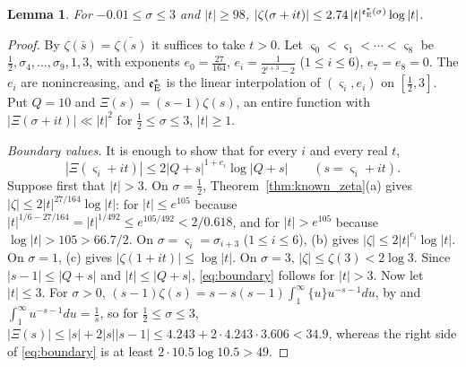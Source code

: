 \documentclass[11pt,a4paper]{article}
\makeatletter
\numberwithin{equation}{section}
\DeclareRobustCommand{\CGref}[1]{\ref{#1}}
\DeclareRobustCommand{\CGeqref}[1]{\eqref{#1}}
\DeclareRobustCommand{\CGcite}[2][]{\if\relax\detokenize{#1}\relax\cite{#2}\else\cite[#1]{#2}\fi}
\let\CG@origref\ref
\let\CG@origeqref\eqref
\newcommand{\CG@gettip}[1]{\@ifundefined{CGTip@#1}{#1}{\csname CGTip@#1\endcsname}}
\newcommand{\CG@getbib}[1]{\@ifundefined{CGBib@#1}{#1}{\csname CGBib@#1\endcsname}}
\DeclareRobustCommand{\CGref}[1]{\pdftooltip{\CG@origref{#1}}{\CG@gettip{#1}}}
\DeclareRobustCommand{\CGeqref}[1]{\pdftooltip{\CG@origeqref{#1}}{\CG@gettip{#1}}}
\DeclareRobustCommand{\CGcite}[2][]{\pdftooltip{\if\relax\detokenize{#1}\relax\cite{#2}\else\cite[#1]{#2}\fi}{\CG@getbib{#2}}}
\newtheorem{lemma}[theorem]{Lemma}
\theoremstyle{definition}
\theoremstyle{remark}
\newcommand{\eE}{\mathfrak e_{\rm E}}
\makeatother
\begin{document}
\begin{lemma}\label{lem:explicit_zeta}
For $-0.01\le\sigma\le3$ and $|t|\ge98$, $|\zeta(\sigma+it)|\le2.74\,|t|^{\eE^*(\sigma)}\log|t|$.
\end{lemma}

\begin{proof}
By $\zeta(\bar s)=\overline{\zeta(s)}$ it suffices to take $t>0$. Let $\varsigma_0<\varsigma_1<\cdots<\varsigma_8$ be $\frac12,\sigma_4,\dots,\sigma_9,1,3$, with exponents $e_0=\frac{27}{164}$, $e_i=\frac1{2^{i+3}-2}$ ($1\le i\le6$), $e_7=e_8=0$. The $e_i$ are nonincreasing, and $\eE^*$ is the linear interpolation of $(\varsigma_i,e_i)$ on $[\frac12,3]$. Put $Q=10$ and $\Xi(s)=(s-1)\zeta(s)$, an entire function with $|\Xi(\sigma+it)|\ll|t|^2$ for $\frac12\le\sigma\le3$, $|t|\ge1$.

\emph{Boundary values.} It is enough to show that for every $i$ and every real $t$,
\begin{equation}
|\Xi(\varsigma_i+it)|\le2|Q+s|^{1+e_i}\log|Q+s|\qquad(s=\varsigma_i+it).
\label{eq:boundary}
\end{equation}
Suppose first that $|t|>3$. On $\sigma=\frac12$, Theorem~\CGref{thm:known_zeta}(a) gives $|\zeta|\le2|t|^{27/164}\log|t|$: for $|t|\le e^{105}$ because $|t|^{1/6-27/164}=|t|^{1/492}\le e^{105/492}<2/0.618$, and for $|t|>e^{105}$ because $\log|t|>105>66.7/2$. On $\sigma=\varsigma_i=\sigma_{i+3}$ ($1\le i\le6$), (b) gives $|\zeta|\le2|t|^{e_i}\log|t|$. On $\sigma=1$, (c) gives $|\zeta(1+it)|\le\log|t|$. On $\sigma=3$, $|\zeta|\le\zeta(3)<2\log3$. Since $|s-1|\le|Q+s|$ and $|t|\le|Q+s|$, \CGeqref{eq:boundary} follows for $|t|>3$. Now let $|t|\le3$. For $\sigma>0$, $(s-1)\zeta(s)=s-s(s-1)\int_1^\infty\{u\}u^{-s-1}du$, by \CGcite[(2.1.4)]{Titchmarsh1986} and $\int_1^\infty u^{-s-1}du=\frac1s$, so for $\frac12\le\sigma\le3$, $|\Xi(s)|\le|s|+2|s||s-1|\le4.243+2\cdot4.243\cdot3.606<34.9$, whereas the right side of \CGeqref{eq:boundary} is at least $2\cdot10.5\log10.5>49$.


\end{proof}
\end{document}
